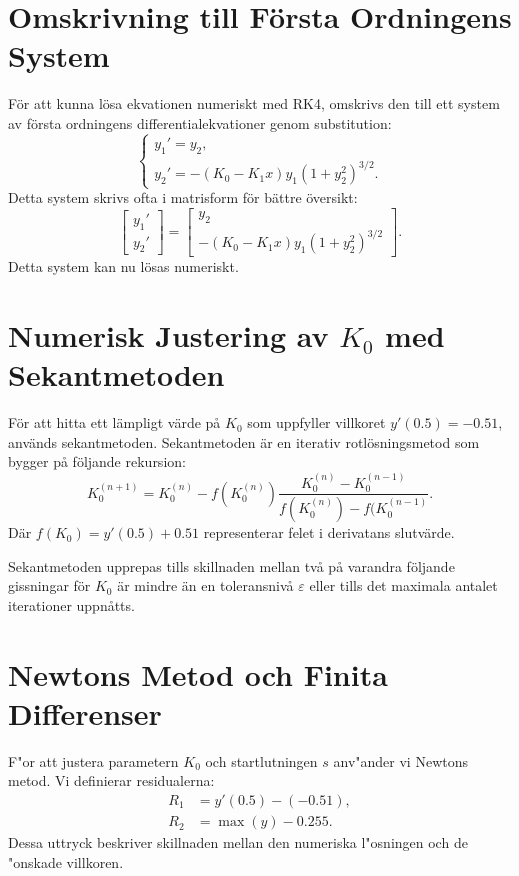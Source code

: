 \documentclass[12pt, letterpaper]{article}
\begin{document}
\section{Omskrivning till Första Ordningens System}
För att kunna lösa ekvationen numeriskt med RK4, omskrivs den till ett system av första ordningens differentialekvationer genom substitution:
\begin{equation}
\begin{cases}
y_1' = y_2, \\
y_2' = - (K_0 - K_1 x) y_1 (1 + y_2^2)^{3/2}.
\end{cases}
\end{equation}
Detta system skrivs ofta i matrisform för bättre översikt:
\begin{equation}
\begin{bmatrix}
y_1' \\
y_2'
\end{bmatrix} =
\begin{bmatrix}
y_2 \\
- (K_0 - K_1 x) y_1 (1 + y_2^2)^{3/2}
\end{bmatrix}.
\end{equation}
Detta system kan nu lösas numeriskt.

\section{Numerisk Justering av $K_0$ med Sekantmetoden}
För att hitta ett lämpligt värde på $K_0$ som uppfyller villkoret $y'(0.5) = -0.51$, används sekantmetoden. Sekantmetoden är en iterativ rotlösningsmetod som bygger på följande rekursion:
\begin{equation}
K_0^{(n+1)} = K_0^{(n)} - f(K_0^{(n)}) \frac{K_0^{(n)} - K_0^{(n-1)}}{f(K_0^{(n)}) - f(K_0^{(n-1)}}.
\end{equation}
Där $f(K_0) = y'(0.5) + 0.51$ representerar felet i derivatans slutvärde.

Sekantmetoden upprepas tills skillnaden mellan två på varandra följande gissningar för $K_0$ är mindre än en toleransnivå $\varepsilon$ eller tills det maximala antalet iterationer uppnåtts.

\section{Newtons Metod och Finita Differenser}
F"or att justera parametern $K_0$ och startlutningen $s$ anv"ander vi Newtons metod. Vi definierar residualerna:
\begin{align}
    R_1 &= y'(0.5) - (-0.51), \\
    R_2 &= \max(y) - 0.255.
\end{align}
Dessa uttryck beskriver skillnaden mellan den numeriska l"osningen och de "onskade villkoren.
\end{document}
